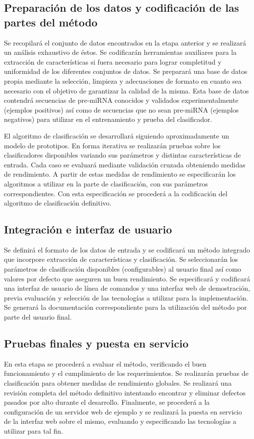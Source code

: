\documentclass[12pt,bibliography=oldstyle,DIV=12,parskip=half-]{scrreprt}
\begin{document}
\subsection{Preparación de los datos y codificación de las partes del método}
Se recopilará el conjunto de datos encontrados en la etapa anterior y
se realizará un análisis exhaustivo de éstos.  Se codificarán
herramientas auxiliares para la extracción de características si fuera
necesario para lograr completitud y uniformidad de los diferentes
conjuntos de datos.  Se preparará una base de datos propia mediante la
selección, limpieza y adecuaciones de formato en cuanto sea necesario
con el objetivo de garantizar la calidad de la misma. Esta base de
datos contendrá secuencias de pre-miRNA conocidos y validados
experimentalmente (ejemplos positivos) así como de secuencias que no
sean pre-miRNA (ejemplos negativos) para utilizar en el entrenamiento
y prueba del clasificador.

El algoritmo de clasificación se desarrollará siguiendo
aproximadamente un modelo de prototipos. En forma iterativa se
realizarán pruebas sobre los clasificadores disponibles variando sus
parámetros y distintas características de entrada. Cada caso se
evaluará mediante validación cruzada obteniendo medidas de
rendimiento. A partir de estas medidas de rendimiento se especificarán
los algoritmos a utilizar en la parte de clasificación, con sus
parámetros correspondientes. Con esta especificación se procederá a la
codificación del algoritmo de clasificación definitivo.
%
\subsection{Integración e interfaz de usuario}
Se definirá el formato de los datos de entrada y se
codificará un método integrado que incorpore extracción de
características y clasificación. Se seleccionarán los parámetros de
clasificación disponibles (configurables) al usuario final así como
valores por defecto que aseguren un buen rendimiento.
%
Se especificará y codificará una interfaz de usuario de línea de
comandos y una interfaz web de demostración, previa evaluación y
selección de las tecnologías a utilizar para la implementación.  Se
generará la documentación correspondiente para la utilización del
método por parte del usuario final.
%
\subsection{Pruebas finales y puesta en servicio}
En esta etapa se procederá a evaluar el método, verificando el buen
funcionamiento y el cumplimiento de los requerimientos. Se realizarán
pruebas de clasificación para obtener medidas de rendimiento globales.
Se realizará una revisión completa del método definitivo intentando
encontrar y eliminar defectos pasados por alto durante el desarrollo.
%
Finalmente, se procederá a la configuración de un servidor web de
ejemplo y se realizará la puesta en servicio de la interfaz web sobre el
mismo, evaluando y especificando las tecnologías a utilizar para tal
fin.
%
%
\end{document}
